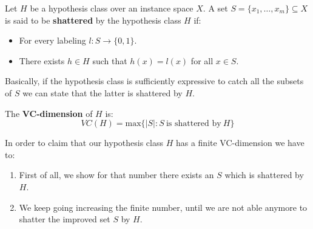 \begin{definition}
    Let $H$ be a hypothesis class over an instance space $X$. A set $S = \{x_1, \dots, x_m\} \subseteq X$ is said to be \textbf{shattered} by the 
    hypothesis class $H$ if:
    \begin{itemize}
        \renewcommand{\labelitemi}{-}
        \item For every labeling $l:S \rightarrow \{0,1\}$.
        \item There exists $h \in H$ such that $h(x) = l(x)$ for all $x \in S$.
    \end{itemize} 
    Basically, if the hypothesis class is sufficiently expressive to catch all the subsets of $S$ we can state that the latter is shattered by $H$. \vspace{7pt}

    The \textbf{VC-dimension} of $H$ is:
    $$VC(H) = \text{max}\{|S|: S \ \text{is shattered by} \ H\}$$
\end{definition}
In order to claim that our hypothesis class $H$ has a finite VC-dimension we have to:
\begin{enumerate}
    \item First of all, we show for that number there exists an $S$ which is shattered by $H$.
    \item We keep going increasing the finite number, until we are not able anymore to shatter the improved set $S$ by $H$.
\end{enumerate}